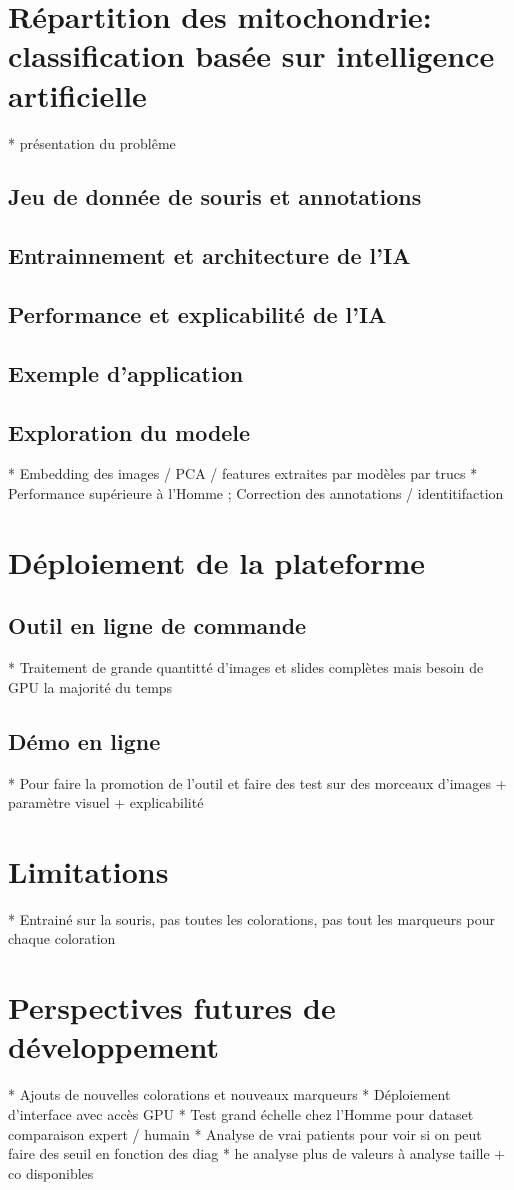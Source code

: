 \section{Répartition des mitochondrie: classification basée sur intelligence artificielle}
* présentation du problême
\subsection{Jeu de donnée de souris et annotations}
\subsection{Entrainnement et architecture de l'IA}
\subsection{ Performance et explicabilité de l'IA}
\subsection{Exemple d'application}
\subsection{Exploration du modele}
* Embedding des images / PCA / features extraites par modèles par trucs
* Performance supérieure à l'Homme ; Correction des annotations / identitifaction


\section{Déploiement de la plateforme}
\subsection{Outil en ligne de commande}
* Traitement de grande quantitté d'images et slides complètes mais besoin de GPU la majorité du temps
\subsection{Démo en ligne}
* Pour faire la promotion de l'outil et faire des test sur des morceaux d'images + paramètre visuel + explicabilité
\section{Limitations}
* Entrainé sur la souris, pas toutes les colorations, pas tout les marqueurs pour chaque coloration

\section{Perspectives futures de développement}
* Ajouts de nouvelles colorations et nouveaux marqueurs
* Déploiement d'interface avec accès GPU
* Test grand échelle chez l'Homme pour dataset comparaison expert / humain
* Analyse de vrai patients pour voir si on peut faire des seuil en fonction des diag
* he analyse plus de valeurs à analyse taille + co disponibles